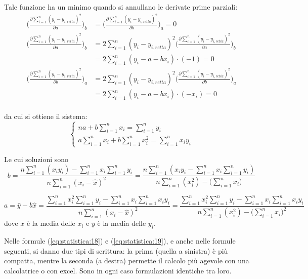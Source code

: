 Tale funzione ha un minimo quando si annullano le derivate prime parziali:
\begin{align*}
\Biggl(\frac{\partial \sum_{i=1}^n (y_i - y_{i,retta})^2}{\partial a}\Biggr)_b & = \Biggl(\frac{\partial \sum_{i=1}^n (y_i - y_{i,retta})^2}{\partial b}\Biggr)_a = 0 \\
\Biggl(\frac{\partial \sum_{i=1}^n (y_i - y_{i,retta})^2}{\partial a}\Biggr)_b & = 2 \sum_{i=1}^n (y_i - y_{i,retta})^2 \Biggl(\frac{\partial \sum_{i=1}^n (y_i - y_{i,retta})^2}{\partial a}\Biggr)_b \\
& = 2 \sum_{i=1}^n (y_i - a - bx_i) \cdot (-1) = 0\\
\Biggl(\frac{\partial \sum_{i=1}^n (y_i - y_{i,retta})^2}{\partial b}\Biggr)_a & = 2 \sum_{i=1}^n (y_i - y_{i,retta})^2 \Biggl(\frac{\partial \sum_{i=1}^n (y_i - y_{i,retta})^2}{\partial b}\Biggr)_a \\
& = 2 \sum_{i=1}^n (y_i - a - bx_i) \cdot (- x_i) = 0\\
\end{align*}

da cui si ottiene il sistema:
\[
\begin{cases}
na + b\sum_{i=1}^n x_i = \sum_{i=1}^n y_i\\
a \sum_{i=1}^n x_i + b \sum_{i=1}^n x_i^2 = \sum_{i=1}^n x_i y_i
\end{cases}
\]

Le cui soluzioni sono
\begin{equation} \label{eq:statistica:18}
b = \dfrac{n \sum_{i=1}^n (x_i y_i) - \sum_{i=1}^n x_i \sum_{i=1}^n y_i}{n \sum_{i=1}^n (x_i - \hat{x})^2} = \dfrac{n \sum_{i=1}^n (x_i y_i - \sum_{i=1}^n x_i \sum_{i=1}^n y_i)}{n \sum_{i=1}^n (x_i^2) - \biggl(\sum_{i=1}^n x_i\biggr)}
\end{equation}

\begin{equation} \label{eq:statistica:19}
a = \hat{y} - b \hat{x} = \dfrac{\sum_{i=1}^n x_i^2 \sum_{i=1}^n y_i - \sum_{i=1}^n x_i \sum_{i=1}^n x_i y_i}{n \sum_{i=1}^n (x_i - \hat{x})^2} = \dfrac{\sum_{i=1}^n x_i^2 \sum_{i=1}^n y_i - \sum_{i=1}^n x_i \sum_{i=1}^n x_i y_i}{n \sum_{i=1}^n (x_i^2) - \biggl(\sum_{i=1}^n x_i \biggr)^2}
\end{equation}
dove $\bar{x}$ è la media delle $x_i$ e $\bar{y}$ è la media delle $y_i$.

Nelle formule (\ref{eq:statistica:18}) e (\ref{eq:statistica:19}), e anche nelle formule seguenti, si danno due tipi di scrittura: la prima (quella a sinistra) è più compatta, mentre la seconda (a destra) permette il calcolo più agevole con una calcolatrice o con excel. Sono in ogni caso formulazioni identiche tra loro.

